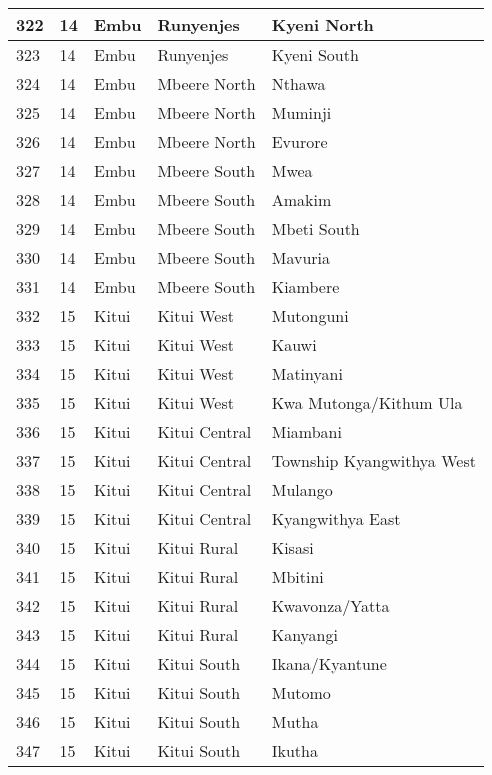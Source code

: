\begin{table}[!ht]
\begin{tabular}{|l|l|l|l|l|}
        322 & 14 & Embu & Runyenjes & Kyeni North \\ \hline
        323 & 14 & Embu & Runyenjes & Kyeni South \\ \hline
        324 & 14 & Embu & Mbeere North & Nthawa \\ \hline
        325 & 14 & Embu & Mbeere North & Muminji \\ \hline
        326 & 14 & Embu & Mbeere North & Evurore \\ \hline
        327 & 14 & Embu & Mbeere South & Mwea \\ \hline
        328 & 14 & Embu & Mbeere South & Amakim \\ \hline
        329 & 14 & Embu & Mbeere South & Mbeti South \\ \hline
        330 & 14 & Embu & Mbeere South & Mavuria \\ \hline
        331 & 14 & Embu & Mbeere South & Kiambere \\ \hline
        332 & 15 & Kitui & Kitui West & Mutonguni \\ \hline
        333 & 15 & Kitui & Kitui West & Kauwi \\ \hline
        334 & 15 & Kitui & Kitui West & Matinyani \\ \hline
        335 & 15 & Kitui & Kitui West & Kwa Mutonga/Kithum Ula \\ \hline
        336 & 15 & Kitui & Kitui Central & Miambani \\ \hline
        337 & 15 & Kitui & Kitui Central & Township Kyangwithya West \\ \hline
        338 & 15 & Kitui & Kitui Central & Mulango \\ \hline
        339 & 15 & Kitui & Kitui Central & Kyangwithya East \\ \hline
        340 & 15 & Kitui & Kitui Rural & Kisasi \\ \hline
        341 & 15 & Kitui & Kitui Rural & Mbitini \\ \hline
        342 & 15 & Kitui & Kitui Rural & Kwavonza/Yatta \\ \hline
        343 & 15 & Kitui & Kitui Rural & Kanyangi \\ \hline
        344 & 15 & Kitui & Kitui South & Ikana/Kyantune \\ \hline
        345 & 15 & Kitui & Kitui South & Mutomo \\ \hline
        346 & 15 & Kitui & Kitui South & Mutha \\ \hline
        347 & 15 & Kitui & Kitui South & Ikutha \\ \hline

\end{tabular}
\end{table}
